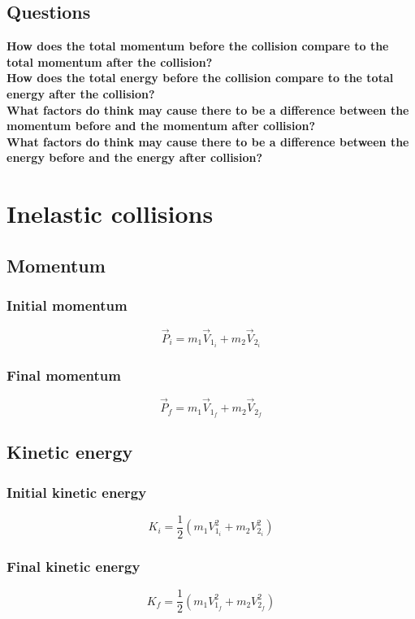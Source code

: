 \documentclass[11pt, letterpaper, includehead]{article}
\begin{document}
\subsection{Questions}
\textbf{How does the total momentum before the collision compare to the total
momentum after the collision?}\\

\textbf{How does the total energy before the collision compare to the total energy
after the collision?}\\

\textbf{What factors do think may cause there to be a difference between the
momentum before and the momentum after collision?}\\

\textbf{What factors do think may cause there to be a difference between the energy
before and the energy after collision?}\\

\section{Inelastic collisions} 
\subsection{Momentum}

\subsubsection{Initial momentum}
$$\vec{P}_i = m_1\vec{V}_{1_i} + m_2\vec{V}_{2_i}$$

\subsubsection{Final momentum}
$$\vec{P}_f = m_1\vec{V}_{1_f} + m_2\vec{V}_{2_f}$$

\subsection{Kinetic energy}

\subsubsection{Initial kinetic energy}
$$K_i = \frac{1}{2}(m_1 V_{1_i}^2 + m_2 V_{2_i}^2)$$


\subsubsection{Final kinetic energy}
$$K_f = \frac{1}{2}(m_1 V_{1_f}^2 + m_2 V_{2_f}^2)$$
\end{document}
